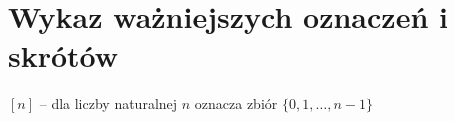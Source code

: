 \section*{Wykaz ważniejszych oznaczeń i skrótów}

$[n]$ -- dla liczby naturalnej $n$ oznacza zbiór $\{0, 1, \ldots, n - 1\}$
